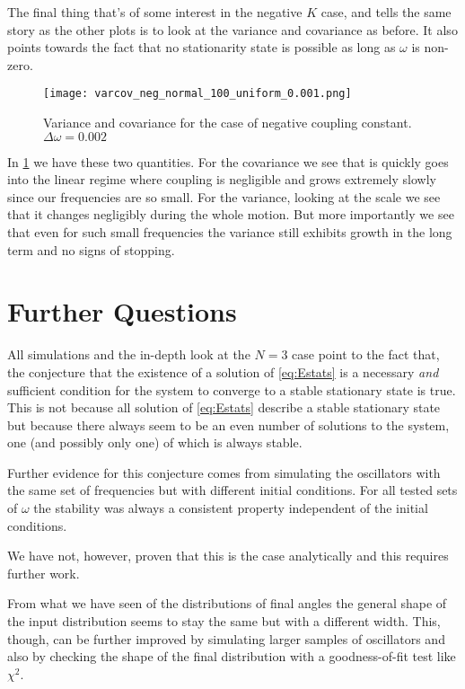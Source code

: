 \documentclass[10pt,a4paper,twocolumn]{article}
\begin{document}
The final thing that's of some interest in the negative $K$ case, and tells the same story as the other plots is to look at the variance and covariance as before. It also points towards the fact that no stationarity state is possible as long as $\omega$ is non-zero.

\begin{figure}[!h]
    \centering
    \texttt{[image: varcov\_neg\_normal\_100\_uniform\_0.001.png]}
    \caption{Variance and covariance for the case of negative coupling constant. $\Delta \omega = 0.002$}
    \label{fig:varcov_neg_100_0.001}
\end{figure}

In \cref{fig:varcov_neg_100_0.001} we have these two quantities. For the covariance we see that is quickly goes into the linear regime where coupling is negligible and grows extremely slowly since our frequencies are so small. For the variance, looking at the scale we see that it changes negligibly during the whole motion. But more importantly we see that even for such small frequencies the variance still exhibits growth in the long term and no signs of stopping.


\section{Further Questions}

All simulations and the in-depth look at the $N=3$ case point to the fact that, the conjecture that the existence of a solution of \cref{eq:Estats} is a necessary \textit{and} sufficient condition for the system to converge to a stable stationary state is true. This is not because all solution of \cref{eq:Estats} describe a stable stationary state but because there always seem to be an even number of solutions to the system, one (and possibly only one) of which is always stable.

Further evidence for this conjecture comes from simulating the oscillators with the same set of frequencies but with different initial conditions. For all tested sets of $\omega$ the stability was always a consistent property independent of the initial conditions.

We have not, however, proven that this is the case analytically and this requires further work.

From what we have seen of the distributions of final angles the general shape of the input distribution seems to stay the same but with a different width. This, though, can be further improved by simulating larger samples of oscillators and also by checking the shape of the final distribution with a goodness-of-fit test like $\chi^2$.



\nocite{existence}


\printbibliography
\end{document}
